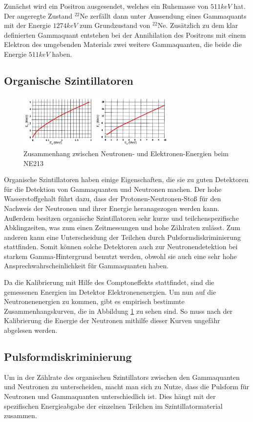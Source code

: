 Zunächst wird ein Positron ausgesendet, welches ein Ruhemasse von $511keV$ hat. Der angeregte Zustand $^{22}$Ne zerfällt dann unter Aussendung eines Gammaquants mit der Energie $1274keV$ zum Grundzustand von $^{22}$Ne. Zusätzlich zu dem klar definierten Gammaquant entstehen bei der Annihilation des Positrons mit einem Elektron des umgebenden Materials zwei weitere Gammaquanten, die beide die Energie $511keV$ haben.

\subsection{Organische Szintillatoren}
\begin{figure}[htbp]  
     \includegraphics[width=0.7\textwidth]{szintillator.png}
  \caption{Zusammenhang zwischen Neutronen- und Elektronen-Energien beim NE213 \cite{anleitung}}
  \label{szintillator}
\end{figure}
Organische Szintillatoren haben einige Eigenschaften, die sie zu guten Detektoren für die Detektion von Gammaquanten und Neutronen machen. Der hohe Wasserstoffgehalt führt dazu, dass der Protonen-Neutronen-Stoß für den Nachweis der Neutronen und ihrer Energie heranagezogen werden kann. Außerdem besitzen organische Szintillatoren sehr kurze und teilchenspezifische Abklingzeiten, was zum einen Zeitmessungen und hohe Zählraten zulässt. Zum anderen kann eine Unterscheidung der Teilchen durch Pulsformdiskriminierung stattfinden. Somit können solche Detektoren auch zur Neutronendetektion bei starkem Gamma-Hintergrund benutzt werden, obwohl sie auch eine sehr hohe Ansprechwahrscheinlichkeit für Gammaquanten haben.

Da die Kalibrierung mit Hilfe des Comptoneffekts stattfindet, sind die gemessenen Energien im Detektor Elektronenenergien. Um nun auf die Neutronenenergien zu kommen, gibt es empirisch bestimmte Zusammenhangskurven, die in Abbildung \ref{szintillator} zu sehen sind. So muss nach der Kalibrierung die Energie der Neutronen mithilfe dieser Kurven ungefähr abgelesen werden.

\subsection{Pulsformdiskriminierung}
Um in der Zählrate des organischen Szintillators zwischen den Gammaquanten und Neutronen zu unterscheiden, macht man sich zu Nutze, dass die Pulsform für Neutronen und Gammaquanten unterschiedlich ist. Dies hängt mit der spezifischen Energieabgabe der einzelnen Teilchen im Szintillatormaterial zusammen. 

